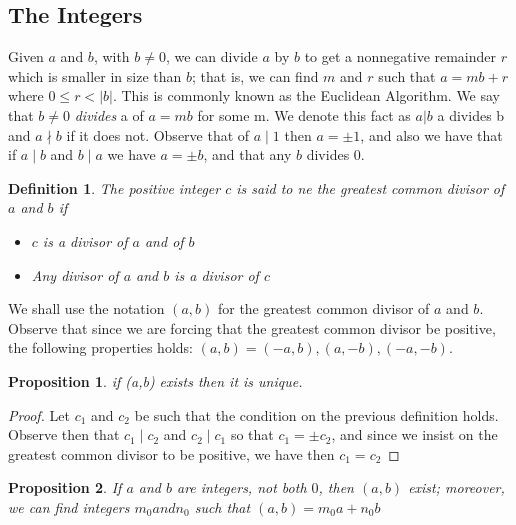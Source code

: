 \documentclass[11pt,a4paper]{article}
\newtheorem{define}{Definition}
\newtheorem{claim}{Proposition}
\begin{document}
\subsection{The Integers}
Given $a$ and $b$, with $ b \neq 0$, we can divide $a$ by $b$ to get a nonnegative remainder $r$ which is smaller in size than $b$; that is, we can find $m$ and $r$ such that $ a = mb + r$ where $ 0 \leq r < |b| $. This is commonly known as the Euclidean Algorithm.
We say that $ b \neq 0 $ \emph{divides } a of $a = mb$ for some m. We denote this fact as $ a \vert b$ a divides b and $ a \nmid b$ if it does not. Observe that of $ a \mid 1$ then $a = \pm 1$, and also we have that if $ a \mid b $ and $ b \mid a$ we have $ a = \pm b $, and that any $b$ divides $0$.
\begin{define}
	The positive integer $c$ is said to ne the greatest common divisor of $a$ and $b$ if
	\begin{itemize}
		\item $c$ is a divisor of $a$ and of $b$
		\item Any divisor of $a$ and $b$ is a divisor of $c$ 
	\end{itemize}
\end{define}
We shall use the notation $(a,b)$ for the greatest common divisor of $a$ and $b$. Observe that since we are forcing that the greatest common divisor be positive, the following properties holds: $(a,b) = (-a,b), (a,-b), (-a,-b)$.
\begin{claim}
	if (a,b) exists then it is unique.
\end{claim}
\begin{proof}
	Let $c_1$ and $c_2$ be such that the condition on the previous definition holds. Observe then that $ c_1 \mid c_2$ and $c_2 \mid c_1$ so that $ c_1 = \pm c_2$, and since we insist on the greatest common divisor to be positive, we have then $ c_1 = c_2 $ 
\end{proof}
\begin{claim}
	If $a$ and $b$ are integers, not both $0$, then $(a,b)$ exist; moreover, we can find integers $m_0 and n_0$ such that $ (a,b) = m_0a + n_0b$
\end{claim}
\end{document}
